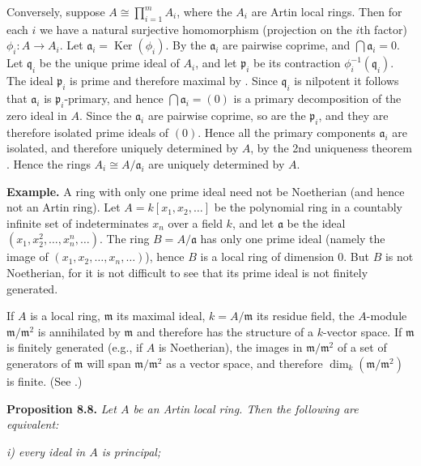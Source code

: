 Conversely, suppose \(A\cong\prod_{i=1}^m A_i\), where the \(A_i\) are Artin local rings. Then for each \(i\) we have a natural surjective homomorphism (projection on the \(i\)th factor) \(\phi_i:A\to A_i\). Let \(\mathfrak a_i=\operatorname{Ker}(\phi_i)\). By  the \(\mathfrak a_i\) are pairwise coprime, and \(\bigcap\mathfrak a_i=0\). Let \(\mathfrak q_i\) be the unique prime ideal of \(A_i\), and let \(\mathfrak p_i\) be its contraction \(\phi_i^{-1}(\mathfrak q_i)\). The ideal \(\mathfrak p_i\) is prime and therefore maximal by . Since \(\mathfrak q_i\) is nilpotent it follows that \(\mathfrak a_i\) is \(\mathfrak p_i\)-primary, and hence \(\bigcap\mathfrak a_i=(0)\) is a primary decomposition of the zero ideal in \(A\). Since the \(\mathfrak a_i\) are pairwise coprime, so are the \(\mathfrak p_i\), and they are therefore isolated prime ideals of \((0)\). Hence all the primary components \(\mathfrak a_i\) are isolated, and therefore uniquely determined by \(A\), by the 2nd uniqueness theorem . Hence the rings \(A_i\cong A/\mathfrak a_i\) are uniquely determined by \(A\). \proofbox

\noindent\textbf{Example.} A ring with only one prime ideal need not be Noetherian (and hence not an Artin ring). Let \(A=k[x_1,x_2,\ldots]\) be the polynomial ring in a countably infinite set of indeterminates \(x_n\) over a field \(k\), and let \(\mathfrak a\) be the ideal \((x_1,x_2^2,\ldots,x_n^n,\ldots)\). The ring \(B=A/\mathfrak a\) has only one prime ideal (namely the image of \((x_1,x_2,\ldots,x_n,\ldots)\)), hence \(B\) is a local ring of dimension 0. But \(B\) is not Noetherian, for it is not difficult to see that its prime ideal is not finitely generated.

If \(A\) is a local ring, \(\mathfrak m\) its maximal ideal, \(k=A/\mathfrak m\) its residue field, the \(A\)-module \(\mathfrak m/\mathfrak m^2\) is annihilated by \(\mathfrak m\) and therefore has the structure of a \(k\)-vector space. If \(\mathfrak m\) is finitely generated (e.g., if \(A\) is Noetherian), the images in \(\mathfrak m/\mathfrak m^2\) of a set of generators of \(\mathfrak m\) will span \(\mathfrak m/\mathfrak m^2\) as a vector space, and therefore \(\dim_k(\mathfrak m/\mathfrak m^2)\) is finite. (See .)

\noindent\textbf{Proposition 8.8.} \emph{Let \(A\) be an Artin local ring. Then the following are equivalent:}

\emph{i) every ideal in \(A\) is principal;}

